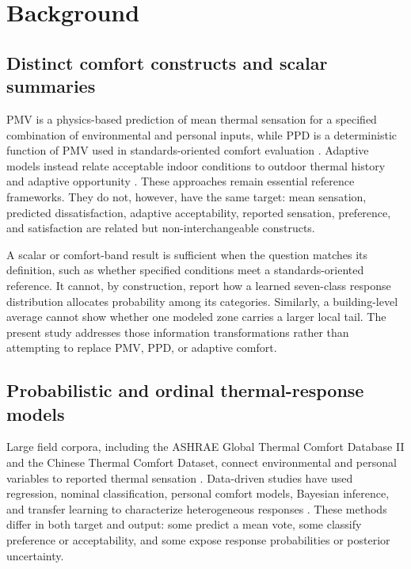 \section{Background}\label{background}

\subsection{Distinct comfort constructs and scalar summaries}

PMV is a physics-based prediction of mean thermal sensation for a specified combination of environmental and personal inputs, while PPD is a deterministic function of PMV used in standards-oriented comfort evaluation \citep{Fanger1970PMV,ISO7730_2025,ASHRAE2023}. Adaptive models instead relate acceptable indoor conditions to outdoor thermal history and adaptive opportunity \citep{deDear1998Adaptive,Brager2000Adaptive,Humphreys2002Adaptive}. These approaches remain essential reference frameworks. They do not, however, have the same target: mean sensation, predicted dissatisfaction, adaptive acceptability, reported sensation, preference, and satisfaction are related but non-interchangeable constructs.

A scalar or comfort-band result is sufficient when the question matches its definition, such as whether specified conditions meet a standards-oriented reference. It cannot, by construction, report how a learned seven-class response distribution allocates probability among its categories. Similarly, a building-level average cannot show whether one modeled zone carries a larger local tail. The present study addresses those information transformations rather than attempting to replace PMV, PPD, or adaptive comfort.

\subsection{Probabilistic and ordinal thermal-response models}

Large field corpora, including the ASHRAE Global Thermal Comfort Database II and the Chinese Thermal Comfort Dataset, connect environmental and personal variables to reported thermal sensation \citep{Foldvary2018GlobalDB,Yang2023ChineseDataset}. Data-driven studies have used regression, nominal classification, personal comfort models, Bayesian inference, and transfer learning to characterize heterogeneous responses \citep{Kim2018PCM,Luo2020CompareML,Kim2019Bayesian,Zhang2024BayesianMeta}. These methods differ in both target and output: some predict a mean vote, some classify preference or acceptability, and some expose response probabilities or posterior uncertainty.


